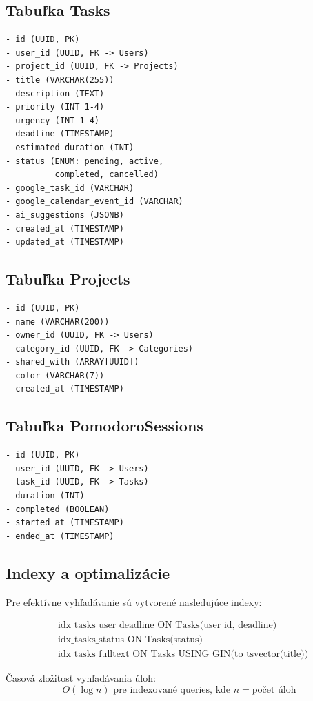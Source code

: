 \documentclass[10pt,twocolumn,twoside,slovak,a4paper]{article}
\begin{document}
\subsection{Tabuľka Tasks}
\begin{verbatim}
- id (UUID, PK)
- user_id (UUID, FK -> Users)
- project_id (UUID, FK -> Projects)
- title (VARCHAR(255))
- description (TEXT)
- priority (INT 1-4)
- urgency (INT 1-4)
- deadline (TIMESTAMP)
- estimated_duration (INT)
- status (ENUM: pending, active,
          completed, cancelled)
- google_task_id (VARCHAR)
- google_calendar_event_id (VARCHAR)
- ai_suggestions (JSONB)
- created_at (TIMESTAMP)
- updated_at (TIMESTAMP)
\end{verbatim}

\subsection{Tabuľka Projects}
\begin{verbatim}
- id (UUID, PK)
- name (VARCHAR(200))
- owner_id (UUID, FK -> Users)
- category_id (UUID, FK -> Categories)
- shared_with (ARRAY[UUID])
- color (VARCHAR(7))
- created_at (TIMESTAMP)
\end{verbatim}

\subsection{Tabuľka PomodoroSessions}
\begin{verbatim}
- id (UUID, PK)
- user_id (UUID, FK -> Users)
- task_id (UUID, FK -> Tasks)
- duration (INT)
- completed (BOOLEAN)
- started_at (TIMESTAMP)
- ended_at (TIMESTAMP)
\end{verbatim}

\subsection{Indexy a optimalizácie}

Pre efektívne vyhľadávanie sú vytvorené nasledujúce indexy:

\[
\begin{aligned}
&\text{idx\_tasks\_user\_deadline} \text{ ON Tasks(user\_id, deadline)} \\
&\text{idx\_tasks\_status} \text{ ON Tasks(status)} \\
&\text{idx\_tasks\_fulltext} \text{ ON Tasks USING GIN(to\_tsvector(title))}
\end{aligned}
\]

Časová zložitosť vyhľadávania úloh:
\[
O(\log n) \text{ pre indexované queries, kde } n = \text{počet úloh}
\]
\end{document}
